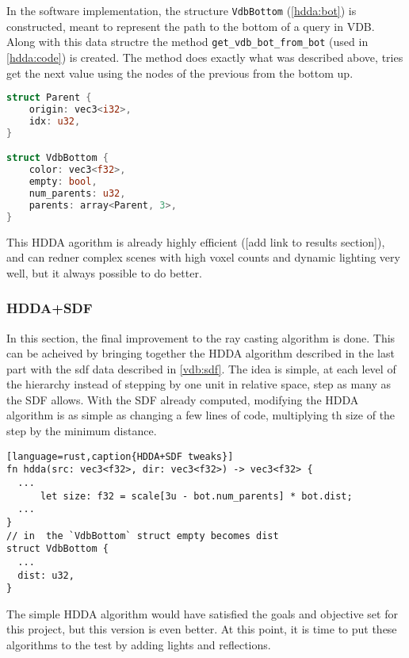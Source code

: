 In the software implementation, the structure \texttt{VdbBottom} (\cref{hdda:bot}) is constructed, meant to represent the path to the bottom of a query in VDB.
Along with this data structre the method \texttt{get\_vdb\_bot\_from\_bot} (used in \cref{hdda:code}) is created.
The method does exactly what was described above, tries get the next value using the nodes of the previous from the bottom up.

\begin{lstlisting}[language=rust, captionpos=b, caption={
    \texttt{VdbBottom} defintion.
    The structure holds the at 3 parents (or less) that the bottom value has, if the the bottom and wether the the bottom was an empty value, and the color information if it was voxel.
  }, label={hdda:bot}]
struct Parent {
    origin: vec3<i32>,
    idx: u32,
}

struct VdbBottom {
    color: vec3<f32>,
    empty: bool,
    num_parents: u32,
    parents: array<Parent, 3>,
}
\end{lstlisting}

This HDDA agorithm is already highly efficient ([add link to results section]), and can redner complex scenes with high voxel counts and dynamic lighting very well, but it always possible to do better.

\subsubsection{HDDA+SDF}
In this section, the final improvement to the ray casting algorithm is done.
This can be acheived by bringing together the HDDA algorithm described in the last part with the \acrshort{sdf} data described in \cref{vdb:sdf}.
The idea is simple, at each level of the hierarchy instead of stepping by one unit in relative space, step as many as the SDF allows.
With the SDF already computed, modifying the HDDA algorithm is as simple as changing a few lines of code, multiplying th size of the step by the minimum distance.

\begin{lstlisting}[language=rust,caption{HDDA+SDF tweaks}]
fn hdda(src: vec3<f32>, dir: vec3<f32>) -> vec3<f32> {
  ...
      let size: f32 = scale[3u - bot.num_parents] * bot.dist;
  ...
}
// in  the `VdbBottom` struct empty becomes dist
struct VdbBottom {
  ...
  dist: u32,
}
\end{lstlisting}

The simple HDDA algorithm would have satisfied the goals and objective set for this project, but this version is even better. At this point, it is time to put these algorithms to the test by adding lights and reflections.

